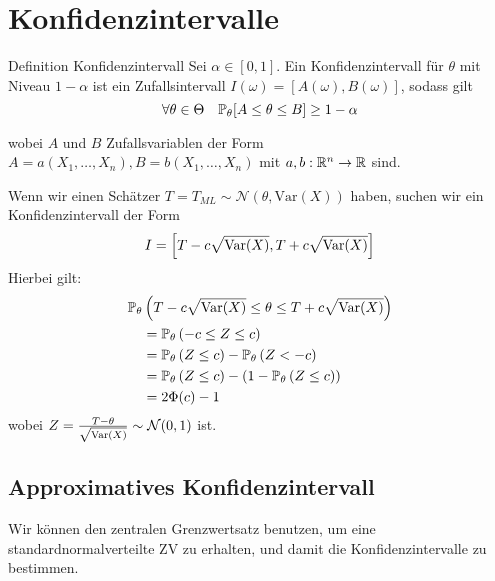 \section{Konfidenzintervalle}
\begin{mainbox}{Definition Konfidenzintervall}
	Sei \(\alpha \in [0,1]\). Ein Konfidenzintervall für \(\theta\) mit Niveau \(1 - \alpha\) ist ein Zufallsintervall \(I(\omega)=[A(\omega),B(\omega)]\), sodass gilt
	\[\forall \theta \in \Theta \quad \P_\theta[A\le \theta \le B] \ge 1- \alpha\]

	wobei \(A\) und \(B\) Zufallsvariablen der Form \(A = a(X_1, \ldots, X_n), B = b(X_1, \ldots, X_n)\) mit \(a,b: \R^n \to \R\) sind.
\end{mainbox}

Wenn wir einen Schätzer \(T = T_{ML} \sim \mathcal{N}\left(\theta, \text{Var}(X)\right)\) haben, suchen wir ein Konfidenzintervall der Form
\[I = \left[T-c \sqrt{\Var(X)}, T+c\sqrt{\Var(X)}\right]\]
Hierbei gilt:
\begin{align*}
	\P_\theta&\left(T-c\sqrt{\Var(X)} \le \theta \le T+c\sqrt{\Var(X)}\right) \\
	&= \P_\theta\left(-c\le Z \le c\right)\\
	&= \P_{\theta}\left(Z \leq c\right) - \P_{\theta}\left(Z < -c\right)\\
	&= \P_{\theta}\left(Z \leq c\right) - \left(1-\P_{\theta}\left(Z \leq c\right)\right)\\
	&= 2\Phi(c)-1
\end{align*}
wobei \(Z = \frac{T-\theta}{\sqrt{\Var(X)}} \sim \mathcal{N}(0,1)\) ist.


\subsection{Approximatives Konfidenzintervall}
Wir können den zentralen Grenzwertsatz benutzen, um eine standardnormalverteilte ZV zu erhalten, und damit die Konfidenzintervalle zu bestimmen.

